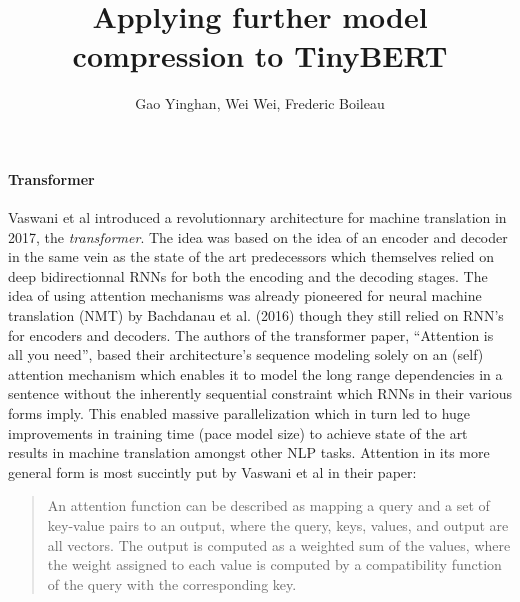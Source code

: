 \message{ !name(projectproposal.tex)}\documentclass{article}
\title{\textbf{Applying further model compression to TinyBERT}}
\author{Gao Yinghan, Wei Wei, Frederic Boileau}
\begin{document}

\thispagestyle{plain}
\maketitle
\medskip


\paragraph{Transformer} Vaswani et al \cite{allyouneed} introduced a
revolutionnary architecture for machine translation in 2017, the
\textit{transformer}.  The idea was based on the idea of an encoder and decoder
in the same vein as the state of the art predecessors which themselves relied on
deep bidirectionnal RNNs for both the encoding and the decoding stages. The idea
of using attention mechanisms was already pioneered for neural machine
translation (NMT) by Bachdanau et al. (2016)\cite{bahdanau2016neural} though
they still relied on RNN's for encoders and decoders. The authors of the
transformer paper, ``Attention is all you need'', based their architecture's
sequence modeling solely on an (self) attention mechanism which enables it to
model the long range dependencies in a sentence without the inherently
sequential constraint which RNNs in their various forms imply. This enabled
massive parallelization which in turn led to huge improvements in training time
(pace model size) to achieve state of the art results in machine translation
amongst other NLP tasks.  Attention in its more general form is most succintly
put by Vaswani et al in their paper: \blockcquote{allyouneed}{An attention
function can be described as mapping a query and a set of key-value pairs to an
output, where the query, keys, values, and output are all vectors.  The output
is computed as a weighted sum of the values, where the weight assigned to each
value is computed by a compatibility function of the
query with the corresponding key.}

\end{document}
